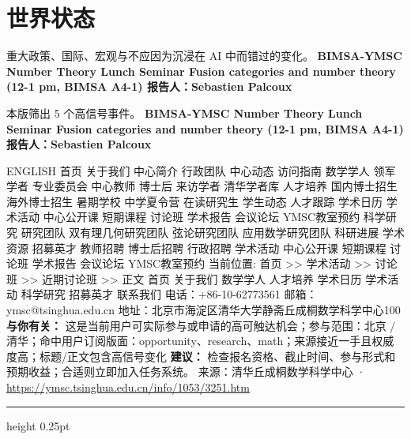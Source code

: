 \documentclass[10.5pt]{ctexart}
\begin{document}
\section*{世界状态}
{\color{ormuted} 重大政策、国际、宏观与不应因为沉浸在 AI 中而错过的变化。}
\vspace{2mm}
{\LARGE\bfseries BIMSA-YMSC Number Theory Lunch Seminar Fusion categories and number theory (12-1 pm, BIMSA A4-1) 报告人：Sebastien Palcoux}\par
\vspace{1mm}
{\color{ormuted} 本版筛出 5 个高信号事件。}
\vspace{3mm}
{\Large\bfseries BIMSA-YMSC Number Theory Lunch Seminar Fusion categories and number theory (12-1 pm, BIMSA A4-1) 报告人：Sebastien Palcoux}\par
ENGLISH 首页 关于我们 中心简介 行政团队 中心动态 访问指南 数学学人 领军学者 专业委员会 中心教师 博士后 来访学者 清华学者库 人才培养 国内博士招生 海外博士招生 暑期学校 中学夏令营 在读研究生 学生动态 人才跟踪 学术日历 学术活动 中心公开课 短期课程 讨论班 学术报告 会议论坛 YMSC教室预约 科学研究 研究团队 双有理几何研究团队 弦论研究团队 应用数学研究团队 科研进展 学术资源 招募英才 教师招聘 博士后招聘 行政招聘 学术活动 中心公开课 短期课程 讨论班 学术报告 会议论坛 YMSC教室预约 当前位置: 首页 >> 学术活动 >> 讨论班 >> 近期讨论班 >> 正文 首页 关于我们 数学学人 人才培养 学术日历 学术活动 科学研究 招募英才 联系我们 电话：+86-10-62773561 邮箱：ymsc@tsinghua.edu.cn 地址：北京市海淀区清华大学静斋丘成桐数学科学中心100
\textbf{与你有关：} 这是当前用户可实际参与或申请的高可触达机会；参与范围：北京 / 清华；命中用户订阅版面：opportunity、research、math；来源接近一手且权威度高；标题/正文包含高信号变化
\textbf{建议：} 检查报名资格、截止时间、参与形式和预期收益；合适则立即加入任务系统。
{\footnotesize\color{ormuted} 来源：清华丘成桐数学科学中心 · \url{https://ymsc.tsinghua.edu.cn/info/1053/3251.htm}}
\vspace{4mm}
\hrule height 0.25pt
\vspace{3mm}
\end{document}
